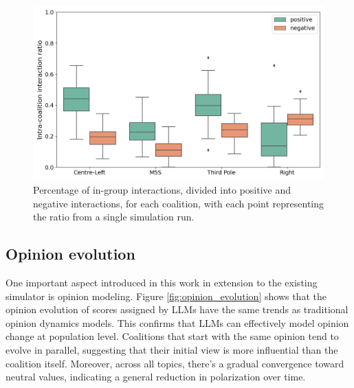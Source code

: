 \begin{figure}[h]
    \centering
    \includegraphics[width=1\linewidth]{Images/Interactions/pos_neg_in_DefaultRecSys.png}
    \caption{Percentage of in-group interactions, divided into positive and negative interactions, for each coalition, with each point representing the ratio from a single simulation run.}
    \label{fig:interactions_inout}
\end{figure}


\subsection{Opinion evolution}
One important aspect introduced in this work in extension to the existing simulator is opinion modeling.
Figure \ref{fig:opinion_evolution} shows that the opinion evolution of scores assigned by LLMs have the same trends as traditional opinion dynamics models.
This confirms that LLMs can effectively model opinion change at population level.
Coalitions that start with the same opinion tend to evolve in parallel, suggesting that their initial view is more influential than the coalition itself.
Moreover, across all topics, there's a gradual convergence toward neutral values, indicating a general reduction in polarization over time.


